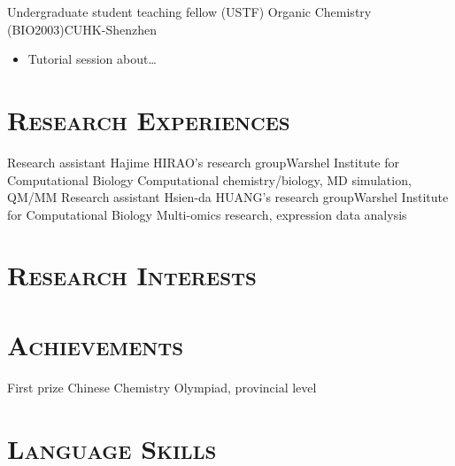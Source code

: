 \documentclass[11pt,a4paper]{moderncv}
\newcommand{\cvsection}[1]{\section{\textsc{#1}}}
\begin{document}
        {Undergraduate student teaching fellow (USTF)}{}
        {Organic Chemistry (BIO2003)}{CUHK-Shenzhen}
        {
                \begin{itemize}
                    \item Tutorial session about\dots
                \end{itemize}
                }


\cvsection{Research Experiences}
        {Research assistant}{}
        {Hajime HIRAO's research group}{Warshel Institute
        for Computational Biology}
        {Computational chemistry/biology, MD simulation, QM/MM}
        {Research assistant}{}
        {Hsien-da HUANG's research group}{Warshel Institute
        for Computational Biology}
        {Multi-omics research, expression data analysis}


\cvsection{Research Interests}

\cvsection{Achievements}
        {First prize}{}
        {Chinese Chemistry Olympiad, provincial level}{}
        {}

\cvsection{Language Skills}

\end{document}
